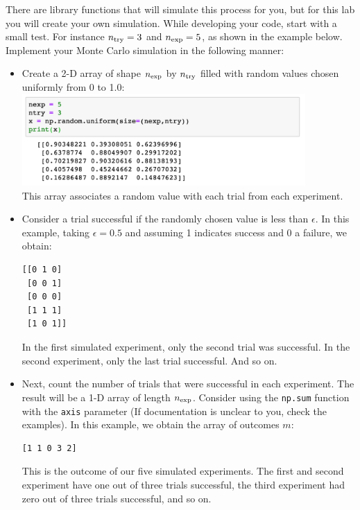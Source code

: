 There are library functions that will simulate this process for you,
but for this lab you will create your own simulation.  While
developing your code, start with a small test. For instance $n_{\rm
  try} = 3$ and $n_{\rm exp}=5$, as shown in the example below.
Implement your Monte Carlo simulation in the following manner:
\begin{itemize}
\item Create a 2-D array of shape $n_{\rm exp}$ by $n_{\rm try}$
  filled with random values chosen uniformly from 0 to 1.0:\\
\includegraphics[width=0.85\textwidth]{figs/labs/distributions/makearray.png} \\
This array associates a random value with each trial from each
experiment.  
\item Consider a trial successful if the randomly chosen value is less
  than $\epsilon$.  In this example, taking $\epsilon = 0.5$ and
  assuming 1 indicates success and 0 a failure, we obtain:
\begin{samepage}
\begin{verbatim}
[[0 1 0]
 [0 0 1]
 [0 0 0]
 [1 1 1]
 [1 0 1]]
\end{verbatim}
\end{samepage}
In the first simulated experiment, only the second trial was
successful.  In the second experiment, only the last trial successful.
And so on.

\item Next, count the number of trials that were successful in each experiment.  The result will be a 1-D array of length $n_{\rm exp}$.  Consider using the {\tt np.sum} function with the {\tt axis} parameter (If documentation is unclear to you, check the examples).    In this example, we obtain the array of outcomes $m$:
\begin{verbatim} 
[1 1 0 3 2]
\end{verbatim}
This is the outcome of our five simulated experiments.  The first
and second experiment have one out of three trials successful, the third
experiment had zero out of three trials successful, and so on.
\end{itemize}

